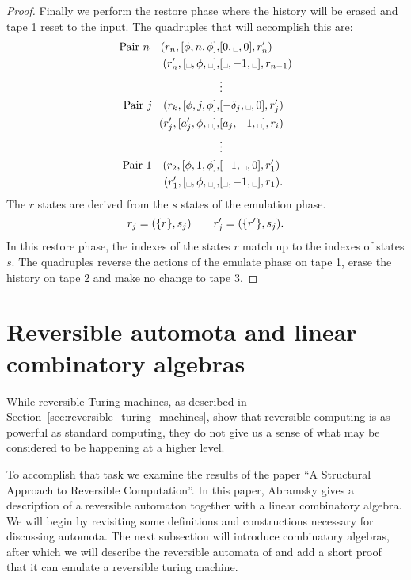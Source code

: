 \begin{proof}
  Finally we perform the restore phase where the history will be erased and tape 1 reset to
  the input. The quadruples that will accomplish this are:
  \begin{align*}
      \text{Pair }n \quad (r_n,[\phi,n,\phi],&[0,\blank,0],r'_n)\\
      (r'_n,[\blank,\phi,\blank],&[\blank,-1,\blank],r_{n-1})\\
      &\vdots\\
      \text{Pair }\jay \quad (r_\kay,[\phi,\jay,\phi],&[-\delta_\jay,\blank,0],r'_\jay)\\
      (r'_\jay,[a'_\jay,\phi,\blank],&[a_\jay,-1,\blank],r_i)\\
      &\vdots\\
      \text{Pair 1} \quad (r_2,[\phi,1,\phi],&[-1,\blank,0],r'_1)\\
      (r'_1,[\blank,\phi,\blank],&[\blank,-1,\blank],r_1).
  \end{align*}
  The $r$ states are derived from the $s$ states of the emulation phase.
  \[
    r_j = (\{r\},s_j) \qquad    r'_j = (\{r'\}, s_j).
  \]
  In this restore phase, the indexes of the states $r$ match up to the indexes of states $s$. The
  quadruples reverse the actions of the emulate phase on tape 1, erase the history on tape 2 and
  make no change to tape 3.

\end{proof}



\section{Reversible automota and linear combinatory algebras} %
\label{sec:reversible_automota_and_linear_combinatory_algebras}
While reversible Turing machines, as described in Section~\ref{sec:reversible_turing_machines},
show that reversible computing is as powerful as standard computing, they do not 
give us a sense of what may be considered to be happening at a higher level. 

To accomplish that task we examine the results of the paper 
``A Structural Approach to Reversible Computation''\cite{abramsky05:reversible}. In this paper,
Abramsky gives a description of a reversible automaton together with a linear combinatory 
algebra. We will begin by revisiting some definitions and constructions necessary for 
discussing automota. The next subsection will introduce combinatory algebras, after which we will
describe the reversible automata of \cite{abramsky05:reversible} and add a short proof that 
it can emulate a reversible turing machine.

